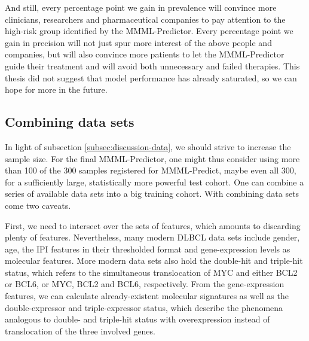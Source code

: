 And still, every percentage point we gain in prevalence will convince more clinicians, researchers 
and pharmaceutical companies to pay attention to the high-risk group identified by the MMML-Predictor.
Every percentage point we gain in precision will not just spur more interest of the above people and 
companies, but will also convince more patients to let the MMML-Predictor guide their treatment and 
will avoid both unnecessary and failed therapies. This thesis did not suggest that model performance 
has already saturated, so we can hope for more in the future.

\subsection{Combining data sets}

In light of subsection \ref{subsec:discussion-data}, we should strive to increase the sample size.
For the final MMML-Predictor, one might thus consider using more than \num{100} of the \num{300} 
samples registered for MMML-Predict, maybe even all \num{300}, for a sufficiently large, 
statistically more powerful test cohort. One can combine a series of available data sets into a 
big training cohort. With combining data sets come two caveats. 

First, we need to intersect over the sets of features, which amounts to discarding plenty 
of features. Nevertheless, many modern DLBCL data sets include gender, age, the IPI features in 
their thresholded format and gene-expression levels as molecular features. More modern data 
sets also hold the double-hit and triple-hit status, which refers to the simultaneous translocation 
of MYC and either BCL2 or BCL6, or MYC, BCL2 and BCL6, respectively. From the gene-expression
features, we can calculate already-existent molecular signatures as well as the double-expressor and 
triple-expressor status, which describe the phenomena analogous to double- and triple-hit status 
with overexpression instead of translocation of the three involved genes.

